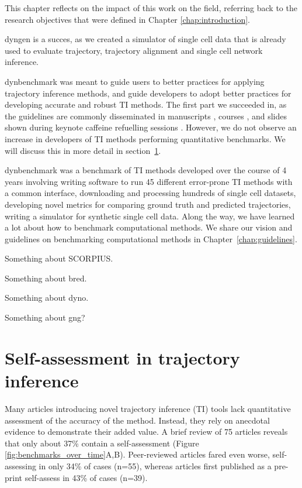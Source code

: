 	
This chapter reflects on the impact of this work on the field, referring back to the research objectives that were defined in Chapter \ref{chap:introduction}. 
	
dyngen is a succes, as we created a simulator of single cell data that is already used to evaluate trajectory\cite{saelens_comparisonsinglecelltrajectory_2019}, trajectory alignment\cite{vandenberge_trajectorybaseddifferentialexpression_2019} and single cell network inference\cite{pratapa_benchmarkingalgorithmsgene_2019}.

dynbenchmark was meant to guide users to better practices for applying trajectory inference methods, and guide developers to adopt better practices for developing accurate and robust TI methods. The first part we succeeded in, as the guidelines are commonly disseminated in manuscripts \cite{lafzi_tutorialguidelinesexperimental_2018,luecken_currentbestpractices_2019}, courses \cite{kiselev_analysissinglecell_2019,martens_analysissinglecell_2019}, and slides shown during keynote caffeine refuelling sessions \cite{hemberg_coffeebreakanalysis_2019}. However, we do not observe an increase in developers of TI methods performing quantitative benchmarks. We will discuss this in more detail in section~\ref{sec:selfassessment}.

dynbenchmark was a benchmark of TI methods developed over the course of 4 years involving writing software to run 45 different error-prone TI methods with a common interface, downloading and processing hundreds of single cell datasets, developing novel metrics for comparing ground truth and predicted trajectories, writing a simulator for synthetic single cell data. Along the way, we have learned a lot about how to benchmark computational methods. We share our vision and guidelines on benchmarking computational methods in Chapter~\ref{chap:guidelines}.

Something about SCORPIUS.

Something about bred.

Something about dyno.

Something about gng?


\section{Self-assessment in trajectory inference} \label{sec:selfassessment}
Many articles introducing novel trajectory inference (TI) tools lack quantitative assessment of the accuracy of the method. Instead, they rely on anecdotal evidence to demonstrate their added value. A brief review of 75 articles reveals that only about 37\% contain a self-assessment (Figure \ref{fig:benchmarks_over_time}A,B). Peer-reviewed articles fared even worse, self-assessing in only 34\% of cases (n=55), whereas articles first published as a pre-print self-assess in 43\% of cases (n=39).

